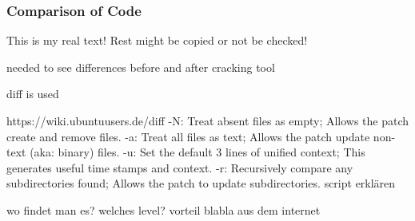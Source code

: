 \subsubsection{Comparison of Code}\label{subsubsection:forensics-tools-diff}
This is my real text! Rest might be copied or not be checked!


needed to see differences before and after cracking tool\newline

diff is used\newline

https://wiki.ubuntuusers.de/diff\newline
-N: Treat absent files as empty; Allows the patch create and remove files.\newline
-a: Treat all files as text; Allows the patch update non-text (aka: binary) files.\newline
-u: Set the default 3 lines of unified context; This generates useful time stamps and context.\newline
-r: Recursively compare any subdirectories found; Allows the patch to update subdirectories.\newline
script erklären\newline



wo findet man es?\newline
welches level?\newline
vorteil\newline
blabla aus dem internet\newline
